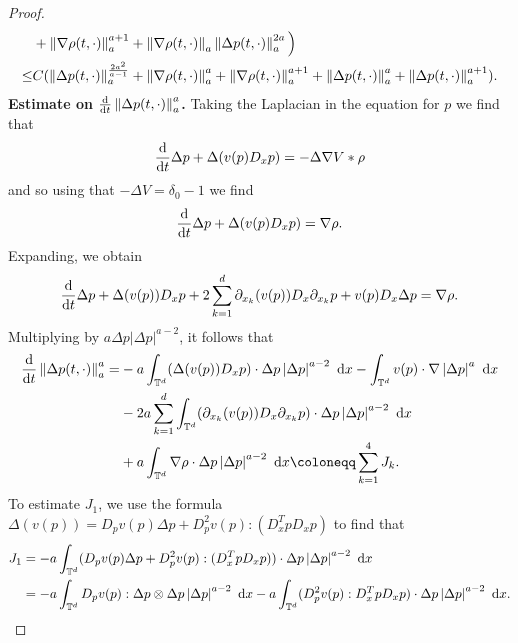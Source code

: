 \documentclass[11pt,reqno]{amsart}
\numberwithin{equation}{section}
\def\dd{{\rm d}}
\begin{document}
\begin{proof}
\begin{align}
&+\left\Vert \nabla \rho(t,\cdot)\right\Vert_{a}^{a+1}+\left\Vert \nabla \rho(t,\cdot)\right\Vert_{a}\left\Vert \Delta p(t,\cdot)\right\Vert_{a}^{2a}\Big) \notag\\
\leq& C(\left\Vert \Delta p(t,\cdot)\right\Vert_{a}^{\frac{2a^{2}}{a-1}} +\left\Vert \nabla \rho(t,\cdot)\right\Vert_{a}^{a}+\left\Vert \nabla \rho(t,\cdot)\right\Vert_{a}^{a+1}+\left\Vert \Delta p(t,\cdot)\right\Vert_{a}^{a}+\left\Vert \Delta p(t,\cdot)\right\Vert_{a}^{a+1}).  
\label{ine for nablarho}         
\end{align}
\textbf{Estimate on $\frac{\dd}{\dd t}\left\Vert \Delta p(t,\cdot)\right\Vert_{a}^{a}$.} Taking the Laplacian in the equation for $p$ we find that 
\begin{align*}
\frac{\dd}{\dd t}\Delta p+\Delta(v(p)D_{x}p)=-\Delta\nabla V\ast \rho    
\end{align*}
and so using that $-\Delta V=\delta_{0}-1$ we find 
\begin{align*}
\frac{\dd}{\dd t}\Delta p+\Delta(v(p)D_{x}p)=\nabla \rho.     
\end{align*}
Expanding, we obtain 
\begin{align*}
\frac{\dd}{\dd t}\Delta p+\Delta(v(p))D_{x}p+2\sum_{k=1}^{d}\partial_{x_{k}}(v(p)) D_{x}\partial_{x_{k}}p+v(p)D_{x}\Delta p=\nabla \rho .     
\end{align*}
Multiplying by $a\Delta p\left\vert \Delta p\right\vert^{a-2}$, it follows that 
\begin{align*}
\frac{\dd}{\dd t}\left\Vert \Delta p(t,\cdot)\right\Vert_{a}^{a}=&-a\int_{\mathbb{T}^{d}} (\Delta (v(p))D_{x}p)\cdot \Delta p\left\vert \Delta p\right\vert^
{a-2}\ \dd x-\int_{\mathbb{T}^{d}} v(p)\cdot \nabla \left\vert \Delta p\right\vert ^{a}\ \dd x\\
&-2a\sum_{k=1}^{d}\int_{\mathbb{T}^{d}} (\partial_{x_{k}}(v(p))D_{x}\partial_{x_{k}}p)\cdot \Delta p\left\vert \Delta p\right\vert^{a-2}\ \dd x\\
&+a\int_{\mathbb{T}^{d}}\nabla \rho \cdot \Delta p\left\vert \Delta p\right\vert^{a-2}\ \dd x \coloneqq \sum_{k=1}^{4}J_{k}.    
\end{align*}
To estimate $J_{1}$, we use the formula $\Delta(v(p))=D_{p}v(p)\Delta p+D^{2}_{p}v(p):(D_{x}^{T}pD_{x}p)$ to find that  
\begin{align}
J_{1}&=-a\int_{\mathbb{T}^{d}} (D_{p}v(p)\Delta p+D_{p}^{2}v(p):(D_{x}^{T}pD_{x}p))\cdot \Delta p\left\vert \Delta p\right\vert^{a-2}\ \dd x \notag\\
&=-a\int_{\mathbb{T}^{d}} D_{p}v(p):\Delta p\otimes \Delta p\left\vert \Delta p\right\vert^{a-2}\ \dd x-a\int_{\mathbb{T}^{d}} (D_{p}^{2}v(p):D_{x}^{T}pD_{x}p) \cdot \Delta p\left\vert \Delta p\right\vert^{a-2}\ \dd x.   \label{rhs ofJ1}

\end{align}
\end{proof}
\end{document}
